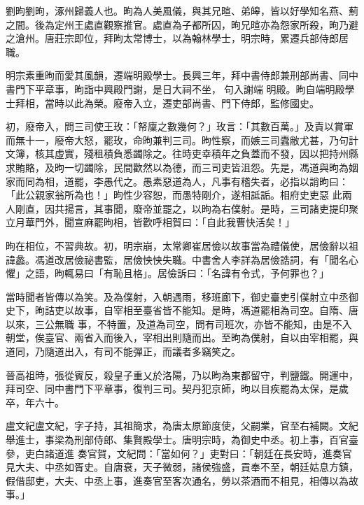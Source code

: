 
\begin{pinyinscope}

 劉昫劉昫，涿州歸義人也。昫為人美風儀，與其兄暄、弟皞，皆以好學知名燕、薊之間。後為定州王處直觀察推官。處直為子都所囚，昫兄暄亦為怨家所殺，昫乃避之滄州。唐莊宗即位，拜昫太常博士，以為翰林學士，明宗時，累遷兵部侍郎居職。



 明宗素重昫而愛其風韻，遷端明殿學士。長興三年，拜中書侍郎兼刑部尚書、同中書門下平章事，昫詣中興殿門謝，是日大祠不坐，句入謝端
 明殿。昫自端明殿學士拜相，當時以此為榮。廢帝入立，遷吏部尚書、門下侍郎，監修國史。



 初，廢帝入，問三司使王玫：「帑廩之數幾何？」玫言：「其數百萬。」及責以賞軍而無十一，廢帝大怒，罷玫，命昫兼判三司。昫性察，而嫉三司蠹敝尤甚，乃句計文簿，核其虛實，殘租積負悉蠲除之。往時吏幸積年之負蓋而不發，因以把持州縣求賄賂，及昫一切蠲除，民間歡然以為德，而三司吏皆沮怨。先是，馮道與昫為姻家而同為相，道罷，李愚代之。愚素惡道為人，凡事有稽失者，必指以誚昫曰：「此公親家翁所為也！」昫性少容恕，而愚特剛介，遂相詆詬。相府史吏惡
 此兩人剛直，因共揚言，其事聞，廢帝並罷之，以昫為右僕射。是時，三司諸吏提印聚立月華門外，聞宣麻罷昫相，皆歡呼相賀曰：「自此我曹快活矣！」



 昫在相位，不習典故。初，明宗崩，太常卿崔居儉以故事當為禮儀使，居儉辭以祖諱蠡。馮道改居儉祕書監，居儉怏怏失職。中書舍人李詳為居儉誥詞，有「聞名心懼」之語，昫輒易曰「有恥且格」。居儉訴曰：「名諱有令式，予何罪也？」



 當時聞者皆傳以為笑。及為僕射，入朝遇雨，移班廊下，御史臺吏引僕射立中丞御史下，昫詰吏以故事，自宰相至臺省皆不能知。是時，馮道罷相為司空。自隋、唐以來，三公無職
 事，不特置，及道為司空，問有司班次，亦皆不能知，由是不入朝堂，俟臺官、兩省入而後入，宰相出則隨而出。至昫為僕射，自以由宰相罷，與道同，乃隨道出入，有司不能彈正，而議者多竊笑之。



 晉高祖時，張從賓反，殺皇子重乂於洛陽，乃以昫為東都留守，判鹽鐵。開運中，拜司空、同中書門下平章事，復判三司。契丹犯京師，昫以目疾罷為太保，是歲卒，年六十。



 盧文紀盧文紀，字子持，其祖簡求，為唐太原節度使，父嗣業，官至右補闕。文紀舉進士，事梁為刑部侍郎、集賢殿學士。唐明宗時，為御史中丞。初上事，百官臺參，吏白諸道進
 奏官賀，文紀問：「當如何？」吏對曰：「朝廷在長安時，進奏官見大夫、中丞如胥史。自唐衰，天子微弱，諸侯強盛，貢奉不至，朝廷姑息方鎮，假借邸吏，大夫、中丞上事，進奏官至客次通名，勞以茶酒而不相見，相傳以為故事。」




\end{pinyinscope}
